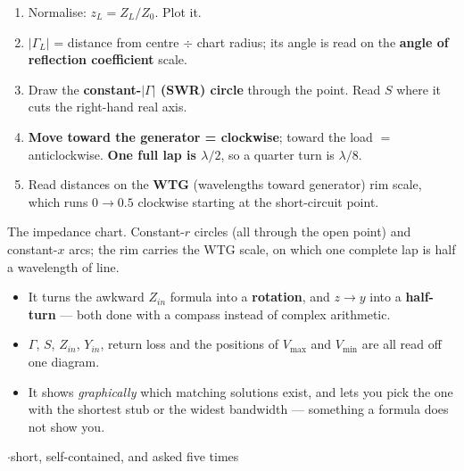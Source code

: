 {\begin{itemize}
\end{itemize}
\begin{enumerate}[label=\arabic*., leftmargin=1.4em]
  \item Normalise: $z_L = Z_L/Z_0$. Plot it.
  \item $|\Gamma_L|$ = distance from centre $\div$ chart radius; its angle is read on the
    \textbf{angle of reflection coefficient} scale.
  \item Draw the \textbf{constant-$|\Gamma|$ (SWR) circle} through the point. Read $S$ where
    it cuts the right-hand real axis.
  \item \textbf{Move toward the generator = clockwise}; toward the load $=$ anticlockwise.
    \textbf{One full lap is $\lambda/2$}, so a quarter turn is $\lambda/8$.
  \item Read distances on the \textbf{WTG} (wavelengths toward generator) rim scale, which
    runs $0 \rightarrow 0.5$ clockwise starting at the short-circuit point.
\end{enumerate}}{%
{\footnotesize\color{sub} The impedance chart. Constant-$r$ circles (all through the open
point) and constant-$x$ arcs; the rim carries the WTG scale, on which one complete lap is
half a wavelength of line.}}

\vspace{2pt}

\begin{itemize}
  \item It turns the awkward $Z_{in}$ formula into a \textbf{rotation}, and $z \rightarrow y$
    into a \textbf{half-turn} --- both done with a compass instead of complex arithmetic.
  \item $\Gamma$, $S$, $Z_{in}$, $Y_{in}$, return loss and the positions of $V_{\max}$ and
    $V_{\min}$ are all read off one diagram.
  \item It shows \emph{graphically} which matching solutions exist, and lets you pick the
    one with the shortest stub or the widest bandwidth --- something a formula does not
    show you.
\end{itemize}

\vspace{2pt}


{\color{sub}\footnotesize {}  \gap$\cdot$\gap short, self-contained, and asked five times}

